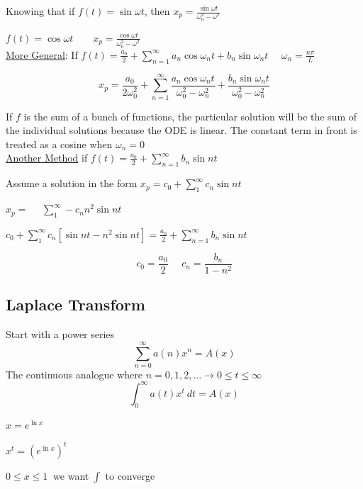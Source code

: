 \documentclass[12pt]{article}
\numberwithin{equation}{subsection}
\newcommand{\indd}{\hspace{2cm}}
\newcommand{\indj}{\hspace{5cm}}
\newcommand{\indk}{\hspace{5.5cm}}
\newcommand{\indt}{\hspace{10cm}}
\newcommand{\indu}{\hspace{10.5cm}}
\begin{document}
\indd Knowing that if $f(t)= \sin \omega t$, then $x_p=\frac{\sin \omega t}{\omega_0^2-\omega^2}$

\indj $f(t)= \cos \omega t \ \ \ \ \ \ \ \ \ x_p=\frac{\cos \omega t}{\omega_0^2-\omega^2}$\\

\underline{More General}: If $\displaystyle f(t)= \frac{a_0}{2}+\sum_{n=1}^{\infty}a_n \cos \omega_nt + b_n \sin \omega_nt\ \ \ \ \ \ \omega_n=\frac{n \pi}{L} $ 


$$  x_p= \frac{a_0}{2 \omega_0^2}+\sum_{n=1}^{\infty} \frac{a_n \cos \omega_nt}{\omega_0^2-\omega_n^2} + \frac{b_n \sin \omega_nt}{\omega_0^2-\omega_n^2} $$

If $f$ is the sum of a bunch of functions, the particular solution will be the sum of the individual solutions because the ODE is linear. The constant term in front is treated as a cosine when $\omega_n = 0$\\

\underline{Another Method} if $\displaystyle f(t)=\frac{a_0}{2}+\sum_{n=1}^{\infty}b_n\sin nt$

Assume a solution in the form $ x_p=c_0+\sum_{1}^{\infty}c_n\sin nt$

\indk $ x_p=\ \  \ \ \ \ \sum_{1}^{\infty}-c_n n^2\sin nt$

\indd $\displaystyle c_0+\sum_{1}^{\infty}c_n[\sin nt -n^2\sin nt] =\frac{a_0}{2}+\sum_{n=1}^{\infty}b_n\sin nt$

\begin{equation}
c_0=\frac{a_0}{2}\ \ \ \ \ \ c_n=\frac{b_n}{1-n^2}
\end{equation}



\subsection{Laplace Transform}
Start with a power series
\begin{equation}
\sum_{n=0}^{\infty}a(n)x^n=A(x)
\end{equation}
The continuous analogue where $n=0,1,2,... \rightarrow 0\leq t \leq \infty$
\begin{equation}
\int_{0}^{\infty}a(t)x^t \ dt = A(x)
\end{equation}

\indu $x=e^{\ln x}$

\indu $x^t=\left(e^{\ln x}\right)^t$

\indt $0 \leq x \leq 1\ $ we want $\int$ to converge
\end{document}
